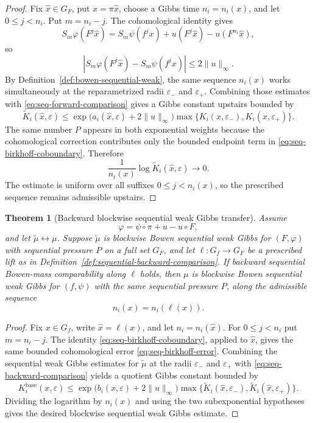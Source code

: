 \documentclass[11pt,a4paper]{article}
\newtheorem{theorem}{Theorem}[section]
\newcommand{\eps}{\varepsilon}
\begin{document}
\begin{proof}
Fix $\hat x\in G_F$, put $x=\pi\hat x$, choose a Gibbs time
$n_i=n_i(x)$, and let $0\le j<n_i$. Put $m=n_i-j$. The cohomological identity
gives
\begin{equation}
 S_m\varphi(F^j\hat x)
 =S_m\psi(f^jx)+u(F^j\hat x)-u(F^{n_i}\hat x),
 \label{eq:seq-birkhoff-coboundary}
\end{equation}
so
\begin{equation}
 \left|S_m\varphi(F^j\hat x)-S_m\psi(f^jx)\right|
 \le2\|u\|_\infty.
 \label{eq:seq-birkhoff-error}
\end{equation}
By Definition~\ref{def:bowen-sequential-weak}, the same sequence $n_i(x)$
works simultaneously at the reparametrized radii $\eps_-$ and $\eps_+$.
Combining those estimates with \eqref{eq:seq-forward-comparison} gives a
Gibbs constant upstairs bounded by
\[
 \widetilde K_i(\hat x,\eps)
 \le
 \exp\bigl(a_i(\hat x,\eps)+2\|u\|_\infty\bigr)
 \max\{K_i(x,\eps_-),K_i(x,\eps_+)\}.
\]
The same number $P$ appears in both exponential weights because the
cohomological correction contributes only the bounded endpoint term in
\eqref{eq:seq-birkhoff-coboundary}. Therefore
\[
 \frac1{n_i(x)}\log \widetilde K_i(\hat x,\eps)\longrightarrow0.
\]
The estimate is uniform over all suffixes $0\le j<n_i(x)$, so the prescribed
sequence remains admissible upstairs.
\end{proof}

\begin{theorem}[Backward blockwise sequential weak Gibbs transfer]
\label{thm:sequential-weak-backward}
Assume
\[
 \varphi=\psi\circ\pi+u-u\circ F,
\]
and let $\widetilde\mu\leftrightarrow\mu$. Suppose $\widetilde\mu$ is
blockwise Bowen sequential weak Gibbs for $(F,\varphi)$ with sequential
pressure $P$ on a full set $G_F$, and let $\ell:G_f\to G_F$ be a prescribed
lift as in Definition~\ref{def:sequential-backward-comparison}. If backward
sequential Bowen-mass comparability along $\ell$ holds, then $\mu$ is
blockwise Bowen sequential weak Gibbs for $(f,\psi)$ with the same sequential
pressure $P$, along the admissible sequence
\[
 n_i(x)=n_i(\ell(x)).
\]
\end{theorem}

\begin{proof}
Fix $x\in G_f$, write $\hat x=\ell(x)$, and let
$n_i=n_i(\hat x)$. For $0\le j<n_i$ put $m=n_i-j$. The identity
\eqref{eq:seq-birkhoff-coboundary}, applied to $\hat x$, gives the same bounded
cohomological error \eqref{eq:seq-birkhoff-error}. Combining the sequential
weak Gibbs estimates for $\widetilde\mu$ at the radii $\eps_-$ and $\eps_+$
with \eqref{eq:seq-backward-comparison} yields a quotient Gibbs constant
bounded by
\[
 K_i^{\mathrm{base}}(x,\eps)
 \le
 \exp\bigl(b_i(x,\eps)+2\|u\|_\infty\bigr)
 \max\{\widetilde K_i(\hat x,\eps_-),\widetilde K_i(\hat x,\eps_+)\}.
\]
Dividing the logarithm by $n_i(x)$ and using the two subexponential
hypotheses gives the desired blockwise sequential weak Gibbs estimate.
\end{proof}
\end{document}
